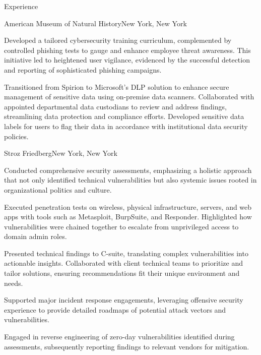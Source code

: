\documentclass[]{mcdowellcv}
\begin{document}
\begin{cvsection}{Experience}
\begin{jobentry}{American Museum of Natural History}{New York, New York}
\begin{jobprojects}
            \item Developed a tailored cybersecurity training curriculum, complemented by controlled phishing tests to gauge and enhance employee threat awareness. This initiative led to heightened user vigilance, evidenced by the successful detection and reporting of sophisticated phishing campaigns.
            \item Transitioned from Spirion to Microsoft's DLP solution to enhance secure management of sensitive data using on-premise data scanners. Collaborated with appointed departmental data custodians to review and address findings, streamlining data protection and compliance efforts. Developed sensitive data labels for users to flag their data in accordance with institutional data security policies. 
        \end{jobprojects}
    \end{jobentry}

    \begin{jobentry}{Stroz Friedberg}{New York, New York}
        \begin{jobpositions}
        \end{jobpositions}
        
        \begin{jobresponsibilities}
            \item Conducted comprehensive security assessments, emphasizing a holistic approach that not only identified technical vulnerabilities but also systemic issues rooted in organizational politics and culture.
            \item Executed penetration tests on wireless, physical infrastructure, servers, and web apps with tools such as Metasploit, BurpSuite, and Responder. Highlighted how vulnerabilities were chained together to escalate from unprivileged access to domain admin roles.
            \item Presented technical findings to C-suite, translating complex vulnerabilities into actionable insights. Collaborated with client technical teams to prioritize and tailor solutions, ensuring recommendations fit their unique environment and needs.
            \item Supported major incident response engagements, leveraging offensive security experience to provide detailed roadmaps of potential attack vectors and vulnerabilities.
            \item Engaged in reverse engineering of zero-day vulnerabilities identified during assessments, subsequently reporting findings to relevant vendors for mitigation.
        \end{jobresponsibilities}
        

\end{jobentry}
\end{cvsection}
\end{document}
